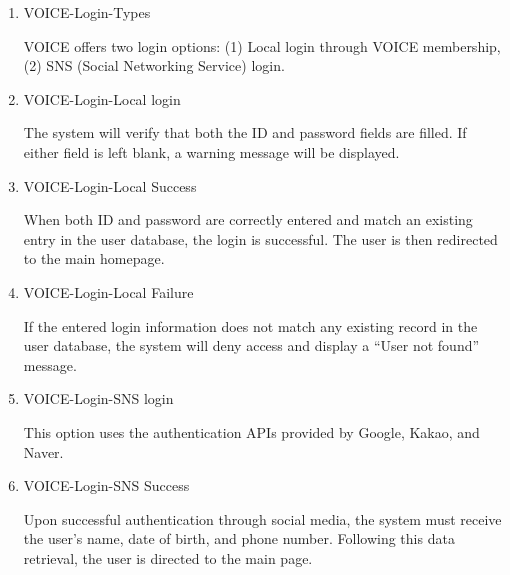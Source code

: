 \documentclass[conference]{IEEEtran}
\begin{document}
\begin{enumerate}[label=\arabic*]
\begin{enumerate}[label=\arabic*)]
        \vspace{1em}

        \item VOICE-Login-Types\par
        \vspace{0.3em}
        VOICE offers two login options: (1) Local login through VOICE membership, (2) SNS (Social Networking Service) login.

        \vspace{1em}

        \item VOICE-Login-Local login\par
        \vspace{0.3em}
        The system will verify that both the ID and password fields are filled. If either field is left blank, a warning message will be displayed.

        \vspace{1em}

        \item VOICE-Login-Local Success\par
        \vspace{0.3em}
        When both ID and password are correctly entered and match an existing entry in the user database, the login is successful. The user is then redirected to the main homepage.

        \vspace{1em}

        \item VOICE-Login-Local Failure\par
        \vspace{0.3em}
        If the entered login information does not match any existing record in the user database, the system will deny access and display a “User not found” message.

        \vspace{1em}

        \item VOICE-Login-SNS login\par
        \vspace{0.3em}
        This option uses the authentication APIs provided by Google, Kakao, and Naver.

        \vspace{1em}

        \item VOICE-Login-SNS Success\par
        \vspace{0.3em}
        Upon successful authentication through social media, the system must receive the user's name, date of birth, and phone number. Following this data retrieval, the user is directed to the main page.
    \end{enumerate}


\end{enumerate}
\end{document}
